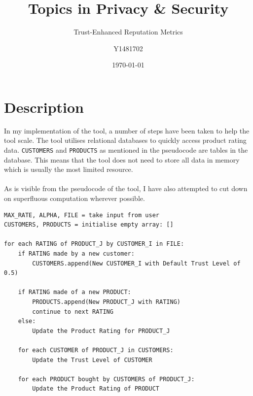 \documentclass{article}
\title{Topics in Privacy \& Security}
\subtitle{Trust-Enhanced Reputation Metrics}
\author{Y1481702}
\date{\today}
\begin{document}
\begin{titlepage}
\maketitle
\tableofcontents
\end{titlepage}



\section{Description} %
In my implementation of the tool, a number of steps have been taken to help the tool scale.
The tool utilises relational databases to quickly access product rating data. \texttt{CUSTOMERS} and \texttt{PRODUCTS} as mentioned in the pseudocode are tables in the database. This means that the tool does not need to store all data in memory which is usually the most limited resource.
\\\\
As is visible from the pseudocode of the tool, I have also attempted to cut down on superfluous computation wherever possible.
\begin{lstlisting}
MAX_RATE, ALPHA, FILE = take input from user
CUSTOMERS, PRODUCTS = initialise empty array: []

for each RATING of PRODUCT_J by CUSTOMER_I in FILE:
	if RATING made by a new customer:
		CUSTOMERS.append(New CUSTOMER_I with Default Trust Level of 0.5)

	if RATING made of a new PRODUCT:
		PRODUCTS.append(New PRODUCT_J with RATING)
		continue to next RATING
	else:
		Update the Product Rating for PRODUCT_J

	for each CUSTOMER of PRODUCT_J in CUSTOMERS:
		Update the Trust Level of CUSTOMER

	for each PRODUCT bought by CUSTOMERS of PRODUCT_J:
		Update the Product Rating of PRODUCT

\end{lstlisting}
\end{document}
